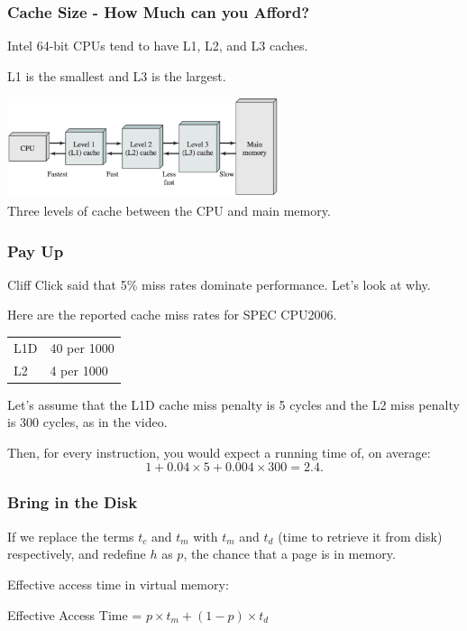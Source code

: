 \begin{frame}
\frametitle{Cache Size - How Much can you Afford?}

Intel 64-bit CPUs tend to have L1, L2, and L3 caches. 

L1 is the smallest and L3 is the largest.

\begin{center}
\includegraphics[width=0.6\textwidth]{images/caches.png}\\
Three levels of cache between the CPU and main memory.
\end{center}


\end{frame}



\begin{frame}
\frametitle{Pay Up}

Cliff Click said that 5\% miss rates dominate performance. Let's look at why.

Here are the reported cache miss rates for SPEC CPU2006.

\begin{center}
\begin{tabular}{ll}
L1D & 40 per 1000 \\
L2 & 4 per 1000
\end{tabular}
\end{center}

Let's assume that the L1D cache miss penalty is 5 cycles and the L2 miss penalty is
300 cycles, as in the video. 

Then, for every instruction, you would expect a running
time of, on average:
\[ 1 + 0.04 \times 5 + 0.004 \times 300 = 2.4. \]

\end{frame}



\begin{frame}
\frametitle{Bring in the Disk}

If we replace the terms $t_{c}$ and $t_{m}$ with $t_{m}$ and $t_{d}$ (time to retrieve it from disk) respectively, and redefine $h$ as $p$, the chance that a page is in memory.

Effective access time in virtual memory: 

\begin{center}
	Effective Access Time = $ p \times t_{m} + (1 - p) \times t_{d}$
\end{center}


\end{frame}



